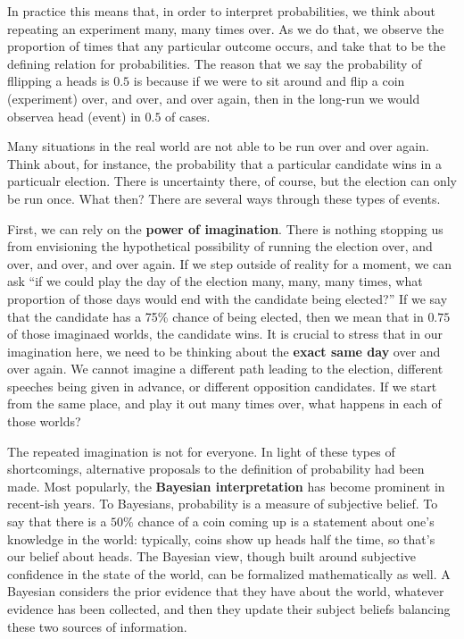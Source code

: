 \documentclass[
  letterpaper,
  DIV=11,
  numbers=noendperiod]{scrreprt}
\begin{document}
In practice this means that, in order to interpret probabilities, we
think about repeating an experiment many, many times over. As we do
that, we observe the proportion of times that any particular outcome
occurs, and take that to be the defining relation for probabilities. The
reason that we say the probability of fllipping a heads is \(0.5\) is
because if we were to sit around and flip a coin (experiment) over, and
over, and over again, then in the long-run we would observea head
(event) in \(0.5\) of cases.

Many situations in the real world are not able to be run over and over
again. Think about, for instance, the probability that a particular
candidate wins in a particualr election. There is uncertainty there, of
course, but the election can only be run once. What then? There are
several ways through these types of events.

First, we can rely on the \textbf{power of imagination}. There is
nothing stopping us from envisioning the hypothetical possibility of
running the election over, and over, and over, and over again. If we
step outside of reality for a moment, we can ask ``if we could play the
day of the election many, many, many times, what proportion of those
days would end with the candidate being elected?'' If we say that the
candidate has a 75\% chance of being elected, then we mean that in
\(0.75\) of those imaginaed worlds, the candidate wins. It is crucial to
stress that in our imagination here, we need to be thinking about the
\textbf{exact same day} over and over again. We cannot imagine a
different path leading to the election, different speeches being given
in advance, or different opposition candidates. If we start from the
same place, and play it out many times over, what happens in each of
those worlds?

The repeated imagination is not for everyone. In light of these types of
shortcomings, alternative proposals to the definition of probability had
been made. Most popularly, the \textbf{Bayesian interpretation} has
become prominent in recent-ish years. To Bayesians, probability is a
measure of subjective belief. To say that there is a \(50\%\) chance of
a coin coming up is a statement about one's knowledge in the world:
typically, coins show up heads half the time, so that's our belief about
heads. The Bayesian view, though built around subjective confidence in
the state of the world, can be formalized mathematically as well. A
Bayesian considers the prior evidence that they have about the world,
whatever evidence has been collected, and then they update their subject
beliefs balancing these two sources of information.
\end{document}
